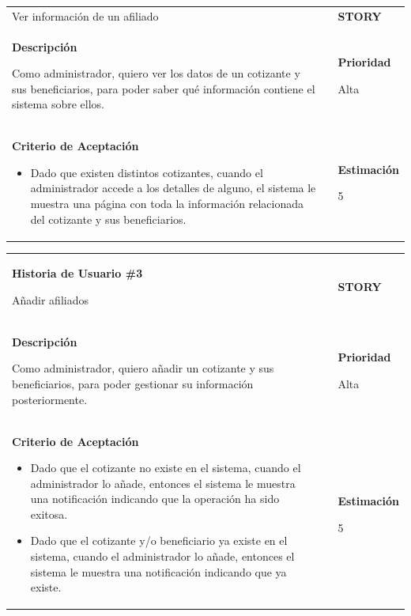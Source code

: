 \documentclass[12pt,a4paper]{article}
\begin{document}
\begin{center}
\begin{tabular}{| p{10cm} c p{2.5cm}|}
Ver información de un afiliado & & \textbf{{\Large STORY}} \\ 
\textbf{Descripción}

Como administrador, quiero ver los datos de un cotizante y sus beneficiarios, para poder saber qué información contiene el sistema sobre ellos. &  & \textbf{Prioridad}

Alta\\

\textbf{Criterio de Aceptación}

\begin{itemize}
\item Dado que existen distintos cotizantes, cuando el administrador accede a los detalles de alguno, el sistema le muestra una página con toda la información relacionada del cotizante y sus beneficiarios.
\end{itemize} & & \textbf{Estimación}

5 \\ 
\hline 
\end{tabular}
\vspace{5mm}

\begin{tabular}{| p{10cm} c p{2.5cm}|}
\hline 
\textbf{Historia de Usuario \#3}

Añadir afiliados & & \textbf{{\Large STORY}} \\ 
\textbf{Descripción}

Como administrador, quiero añadir un cotizante y sus beneficiarios, para
poder gestionar su información posteriormente. &  & \textbf{Prioridad}

Alta\\

\textbf{Criterio de Aceptación}

\begin{itemize}
\item Dado que el cotizante no existe en el sistema, cuando el
administrador lo añade, entonces el sistema le muestra una
notificación indicando que la operación ha sido exitosa.
\item Dado que el cotizante y/o beneficiario ya existe en el sistema,
cuando el administrador lo añade, entonces el sistema le
muestra una notificación indicando que ya existe.
\end{itemize} & & \textbf{Estimación}

5 \\ 
\hline 
\end{tabular}
\vspace{5mm}


\end{center}
\end{document}
